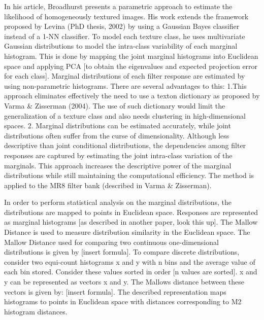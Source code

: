 In his article, Broadhurst presents a parametric approach to estimate the likelihood of homogeneously textured images. His work extends the framework proposed by Levina (PhD thesis, 2002) by using a Gaussian Bayes classifier instead of a 1-NN classifier. To model each texture class, he uses multivariate Gaussian distributions to model the intra-class variability of each marginal histogram. This is done by mapping the joint marginal histograms into Euclidean space and applying PCA [to obtain the eigenvalues and expected projection error for each class].
Marginal distributions of each filter response are estimated by using non-parametric histograms. There are several advantages to this:
	1.This approach eliminates effectively the need to use a texton dictionary as proposed by Varma \& Zisserman (2004). The use of such dictionary would limit the generalization of a texture class and also needs clustering in high-dimensional spaces.
	2. Marginal distributions can be estimated accurately, while joint distributions often suffer from the curse of dimensionality.
Although less descriptive than joint conditional distributions, the dependencies among filter responses are captured by estimating the joint intra-class variation of the marginals. This approach increases the descriptive power of the marginal distributions while still maintaining the computational efficiency. The method is applied to the MR8 filter bank (described in Varma \& Zisserman).

In order to perform statistical analysis on the marginal distributions, the distributions are mapped to points in Euclidean space. 
Responses are represented as marginal histograms [as described in another paper, look this up]. The Mallow Distance is used to measure distribution similarity in the Euclidean space. The Mallow Distance used for comparing two continuous one-dimensional distributions is given by [insert formula]. To compare discrete distributions, consider two equi-count histograms x and y with n bins and the average value of each bin stored. Consider these values sorted in order [n values are sorted]. x and y can be represented as vectors x and y. The Mallows distance between these vectors is given by: [insert formula]. The described representation maps histograms to points in Euclidean space with distances corresponding to M2 histogram distances.

